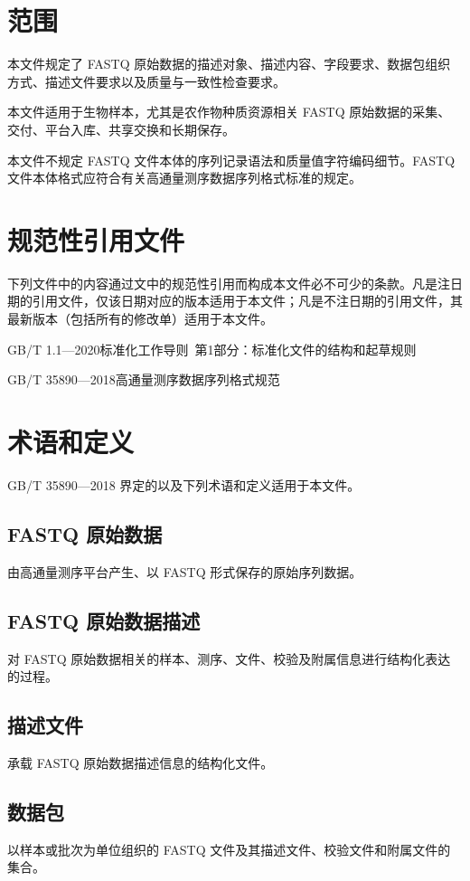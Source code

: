 \chapter{范围}
本文件规定了 FASTQ 原始数据的描述对象、描述内容、字段要求、数据包组织方式、描述文件要求以及质量与一致性检查要求。

本文件适用于生物样本，尤其是农作物种质资源相关 FASTQ 原始数据的采集、交付、平台入库、共享交换和长期保存。

本文件不规定 FASTQ 文件本体的序列记录语法和质量值字符编码细节。FASTQ 文件本体格式应符合有关高通量测序数据序列格式标准的规定。

\chapter{规范性引用文件}
下列文件中的内容通过文中的规范性引用而构成本文件必不可少的条款。凡是注日期的引用文件，仅该日期对应的版本适用于本文件；凡是不注日期的引用文件，其最新版本（包括所有的修改单）适用于本文件。

GB/T 1.1—2020\quad 标准化工作导则\ 第1部分：标准化文件的结构和起草规则

GB/T 35890—2018\quad 高通量测序数据序列格式规范

\chapter{术语和定义}
GB/T 35890—2018 界定的以及下列术语和定义适用于本文件。

\section{FASTQ 原始数据}
由高通量测序平台产生、以 FASTQ 形式保存的原始序列数据。

\section{FASTQ 原始数据描述}
对 FASTQ 原始数据相关的样本、测序、文件、校验及附属信息进行结构化表达的过程。

\section{描述文件}
承载 FASTQ 原始数据描述信息的结构化文件。

\section{数据包}
以样本或批次为单位组织的 FASTQ 文件及其描述文件、校验文件和附属文件的集合。

